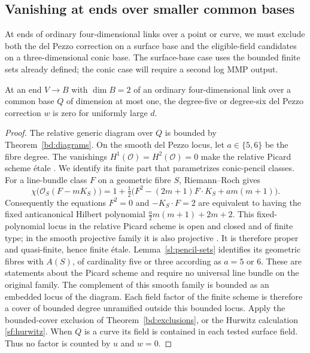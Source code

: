 \subsection{Vanishing at ends over smaller common bases}

At ends of ordinary four-dimensional links over a point or curve,
we must exclude both the del Pezzo correction on a surface base and
the eligible-field candidates on a three-dimensional conic base.
The surface-base case uses the bounded finite sets already defined;
the conic case will require a second log MMP output.

\begin{lemma}\label{sf:surface-end}
At an end $V\to B$ with $\dim B=2$ of an ordinary four-dimensional
link over a common base $Q$ of dimension at most one, the
degree-five or degree-six del Pezzo correction $w$ is zero for
uniformly large $d$.
\end{lemma}

\begin{proof}
The relative generic diagram over $Q$ is bounded by
Theorem~\ref{bd:diagrams}.  On the smooth del Pezzo locus, let
$a\in\{5,6\}$ be the fibre degree.  The vanishings
$H^1(\mathcal O)=H^2(\mathcal O)=0$ make the relative Picard scheme
\'etale
\cite[Theorem~4.8, Corollary~5.13 and Proposition~5.19]{KleimanPicard057}.
We identify its finite part that parametrizes conic-pencil classes.
For a line-bundle class $F$ on a geometric fibre $S$, Riemann--Roch gives
\[
 \chi\bigl(\mathcal O_S(F-mK_S)\bigr)
 =1+\tfrac12\bigl(F^2-(2m+1)F\cdot K_S+a m(m+1)\bigr).
\]
Consequently the equations $F^2=0$ and $-K_S\cdot F=2$ are equivalent
to having the fixed anticanonical Hilbert polynomial
$\tfrac a2m(m+1)+2m+2$.
This fixed-polynomial locus in the relative Picard scheme is open and
closed and of finite type; in the smooth projective family it is also
projective
\cite[Theorem~6.20, Exercise~5.7 and its answer]{KleimanPicard057}.
It is therefore proper and quasi-finite, hence finite \'etale.
Lemma~\ref{sl:pencil-sets} identifies its geometric fibres
with $A(S)$, of cardinality five or three according as $a=5$ or $6$.
These are statements about the Picard scheme and require no universal
line bundle on the original family.
The complement of this smooth family is bounded as an embedded locus
of the diagram.  Each field factor of the finite scheme is
therefore a cover of bounded degree unramified outside this bounded
locus.  Apply the bounded-cover exclusion of
Theorem~\ref{bd:exclusions}, or the Hurwitz calculation
\eqref{sf:hurwitz}.  When $Q$ is a curve its field is contained in
each tested surface field.  Thus no factor is counted by $u$ and
$w=0$.
\end{proof}

